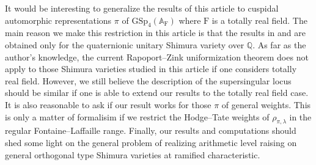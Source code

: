 \documentclass[10pt]{amsart}
\numberwithin{equation}{section}
\theoremstyle{definition}
\def\GSp{\mathrm{GSp}}
\def\QQ{\mathbb{Q}}
\def\rmF{\mathrm{F}}
\begin{document}
It would be interesting to generalize the results of this article to cuspidal automorphic representations $\pi$ of $\GSp_{4}(\mathbb{A}_{\rmF})$ where $\rmF$ is a totally real field. The main reason we make this restriction in this article is that the results in \cite{Wanga, Wangb} and \cite{Oki} are obtained only for the quaternionic unitary Shimura variety over $\QQ$. As far as the author's knowledge, the current Rapoport--Zink uniformization theorem does not apply to those Shimura varieties studied in this article if one considers totally real field. However, we still believe the description of the supersingular locus should be similar if one is able to extend our results to the totally real field case. It is also reasonable to ask if our result works for those $\pi$ of general weights. This is only a matter of formalisim if we restrict the Hodge--Tate weights of $\rho_{\pi, \lambda}$ in the regular Fontaine--Laffaille range. Finally, our results and computations should shed some light on the general problem of realizing arithmetic level raising on general orthogonal type Shimura varieties at ramified characteristic.
 
\end{document}
